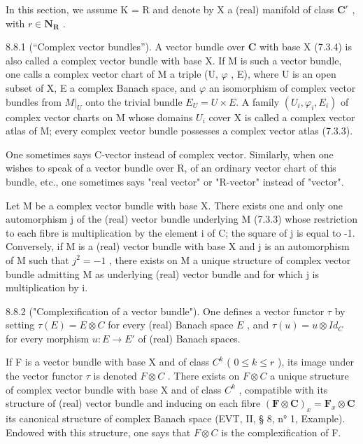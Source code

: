 In this section, we assume K = R and denote by X a (real) manifold of class \(\mathbf{C}^{r}\) , with \(r \in \mathbf{N}_{\mathbf{R}}\) .

8.8.1 (“Complex vector bundles”). A vector bundle over \(\mathbf{C}\) with base X (7.3.4) is also called a complex vector bundle with base X. If M is such a vector bundle, one calls a complex vector chart of M a triple (U, \(\varphi\) , E), where U is an open subset of X, E a complex Banach space, and \(\varphi\) an isomorphism of complex vector bundles from \(M|_U\) onto the trivial bundle \(E_U = U \times E\). A family \((U_i,\varphi_i,E_i)\) of complex vector charts on M whose domains \(U_i\) cover X is called a complex vector atlas of M; every complex vector bundle possesses a complex vector atlas (7.3.3).

One sometimes says C-vector instead of complex vector. Similarly, when one wishes to speak of a vector bundle over R, of an ordinary vector chart of this bundle, etc., one sometimes says "real vector" or "R-vector" instead of "vector".

Let M be a complex vector bundle with base X. There exists one and only one automorphism j of the (real) vector bundle underlying M (7.3.3) whose restriction to each fibre is multiplication by the element i of C; the square of j is equal to -1. Conversely, if M is a (real) vector bundle with base X and j is an automorphism of M such that \(j^{2} = -1\) , there exists on M a unique structure of complex vector bundle admitting M as underlying (real) vector bundle and for which j is multiplication by i.

8.8.2 ("Complexification of a vector bundle"). One defines a vector functor \(\tau\) by setting \(\tau(E) = E \otimes C\) for every (real) Banach space \(E\) , and \(\tau(u) = u \otimes Id_{C}\) for every morphism \(u: E \to E'\) of (real) Banach spaces.

If F is a vector bundle with base X and of class \(C^{k}\) ( \(0 \leqslant k \leqslant r\) ), its image under the vector functor \(\tau\) is denoted \(F \otimes C\) . There exists on \(F \otimes C\) a unique structure of complex vector bundle with base X and of class \(C^{k}\) , compatible with its structure of (real) vector bundle and inducing on each fibre \((\mathbf{F} \otimes \mathbf{C})_{x} = \mathbf{F}_{x} \otimes \mathbf{C}\) its canonical structure of complex Banach space (EVT, II, § 8, n° 1, Example). Endowed with this structure, one says that \(F \otimes C\) is the complexification of F.

